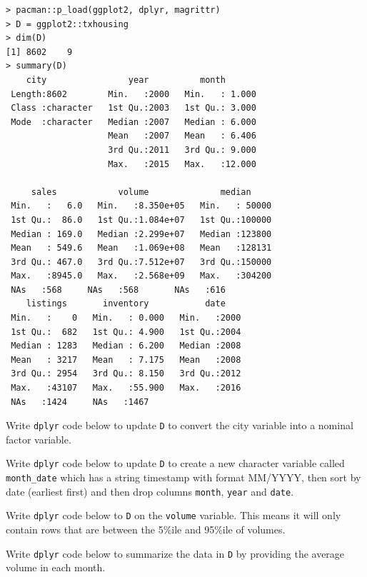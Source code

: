 \documentclass[12pt]{article}
\begin{document}
\lstset{basicstyle=\footnotesize}
\begin{lstlisting}
> pacman::p_load(ggplot2, dplyr, magrittr)
> D = ggplot2::txhousing
> dim(D)
[1] 8602    9
> summary(D)
    city                year          month       
 Length:8602        Min.   :2000   Min.   : 1.000  
 Class :character   1st Qu.:2003   1st Qu.: 3.000  
 Mode  :character   Median :2007   Median : 6.000  
                    Mean   :2007   Mean   : 6.406  
                    3rd Qu.:2011   3rd Qu.: 9.000  
                    Max.   :2015   Max.   :12.000  
                                                   
     sales            volume              median      
 Min.   :   6.0   Min.   :8.350e+05   Min.   : 50000  
 1st Qu.:  86.0   1st Qu.:1.084e+07   1st Qu.:100000  
 Median : 169.0   Median :2.299e+07   Median :123800  
 Mean   : 549.6   Mean   :1.069e+08   Mean   :128131  
 3rd Qu.: 467.0   3rd Qu.:7.512e+07   3rd Qu.:150000  
 Max.   :8945.0   Max.   :2.568e+09   Max.   :304200  
 NAs   :568     NAs   :568       NAs   :616     
    listings       inventory           date     
 Min.   :    0   Min.   : 0.000   Min.   :2000  
 1st Qu.:  682   1st Qu.: 4.900   1st Qu.:2004  
 Median : 1283   Median : 6.200   Median :2008  
 Mean   : 3217   Mean   : 7.175   Mean   :2008  
 3rd Qu.: 2954   3rd Qu.: 8.150   3rd Qu.:2012  
 Max.   :43107   Max.   :55.900   Max.   :2016  
 NAs   :1424     NAs   :1467                   
\end{lstlisting}
\vspace{-1cm}

\benum

 Write \texttt{dplyr} code below to update \texttt{D} to convert the city variable into a nominal factor variable. 

 Write \texttt{dplyr} code below to update \texttt{D} to create a new character variable called \texttt{month\_date} which has a string timestamp with format MM/YYYY, then sort by date (earliest first) and then drop columns \texttt{month}, \texttt{year} and \texttt{date}. 

 Write \texttt{dplyr} code below to  \texttt{D} on the \texttt{volume} variable. This means it will only contain rows that are between the 5\%ile and 95\%ile of volumes. 

 Write \texttt{dplyr} code below to summarize the data in \texttt{D} by providing the average volume in each month. 
\end{document}
